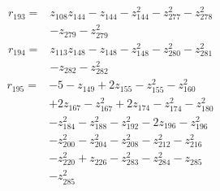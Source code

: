 \begin{align*}
r_{193}={}&z_{108}z_{144} -z_{144} -z_{144}^{2} -z_{277}^{2} -z_{278}^{2}\\
&-z_{279} -z_{279}^{2}
\end{align*}
\begin{align*}
r_{194}={}&z_{113}z_{148} -z_{148} -z_{148}^{2} -z_{280}^{2} -z_{281}^{2}\\
&-z_{282} -z_{282}^{2}
\end{align*}
\begin{align*}
r_{195}={}&-5 -z_{149} +2z_{155} -z_{155}^{2} -z_{160}^{2}\\
&+2z_{167} -z_{167}^{2} +2z_{174} -z_{174}^{2} -z_{180}^{2}\\
&-z_{184}^{2} -z_{188}^{2} -z_{192}^{2} -2z_{196} -z_{196}^{2}\\
&-z_{200}^{2} -z_{204}^{2} -z_{208}^{2} -z_{212}^{2} -z_{216}^{2}\\
&-z_{220}^{2} +z_{226} -z_{283}^{2} -z_{284}^{2} -z_{285}\\
&-z_{285}^{2}
\end{align*}
\endgroup
